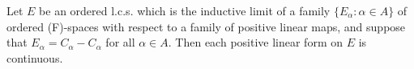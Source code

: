 Let $E$ be an ordered l.c.s. which is the inductive limit of a family $\{E_\alpha : \alpha \in A\}$ of ordered (F)-spaces with respect to a family of positive linear maps, and suppose that $E_\alpha = C_\alpha - C_\alpha$ for all $\alpha \in A$. Then each positive linear form on $E$ is continuous.
